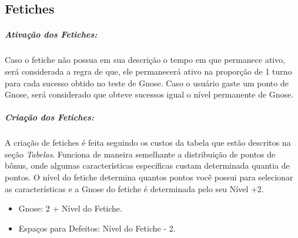 \subsection{\bf Fetiches}

\subparagraph{\bf Ativação dos Fetiches:}
Caso o fetiche não possua em sua descrição o tempo em que permanece ativo, será considerada a regra de que, ele permanecerá ativo na proporção de 1 turno para cada sucesso obtido no teste de Gnose. Caso o usuário gaste um ponto de Gnose, será considerado que obteve sucessos igual o nível permanente de Gnose.

\subparagraph{\bf Criação dos Fetiches:}
A criação de fetiches é feita seguindo os custos da tabela que estão descritos na seção \textit{Tabelas}. Funciona de maneira semelhante a distribuição de pontos de bônus, onde algumas características específicas custam determinada quantia de pontos. O nível do fetiche determina quantos pontos você possui para selecionar as características e a Gnose do fetiche é determinada pelo seu Nível +2.
\begin{itemize}[noitemsep]
\item Gnose: 2 + Nível do Fetiche.
\item Espaços para Defeitos: Nível do Fetiche - 2.
\end{itemize}